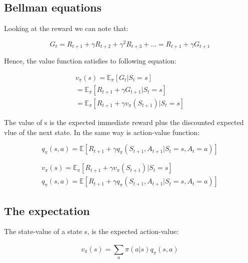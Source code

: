 \subsection{Bellman equations}
Looking at the reward we can note that:

	\begin{equation}
		G_t = R_{t+1} + \gamma R_{t+2} + \gamma^{2} R_{t+3} + ... = R_{t+1} + \gamma G_{t+1}
	\end{equation}

Hence, the value function satisfies to following equation:

	\begin{equation}
	\begin{aligned}
		v_\pi(s) = \mathbb{E}_\pi [G_t | S_t = s]\\
		= \mathbb{E}_\pi [R_{t+1} + \gamma G_{t+1} | S_t = s] \\
		= \mathbb{E}_\pi [R_{t+1} + \gamma v_\pi(S_{t+1}) | S_t =s ]
	\end{aligned}
	\end{equation}

The value of s is the expected immediate reward plus the discounted expected vlue of the next state. In the same way is action-value function: 

	\begin{equation}
		q_\pi (s,a) = \mathbb{E} [R_{t+1} + \gamma q_\pi(S_{t+1}, A_{t+1} | S_t = s, A_t = a)]
	\end{equation}
	

\begin{wbox}{}
	\begin{equation}
	\begin{aligned}
		v_\pi(s) = \mathbb{E}_\pi [R_{t+1} + \gamma v_\pi(S_{t+1}) | S_t =s ]\\
		q_\pi (s,a) = \mathbb{E} [R_{t+1} + \gamma q_\pi(S_{t+1}, A_{t+1} | S_t = s, A_t = a)] 
	\end{aligned}
	\end{equation}
\end{wbox}

\subsection{The expectation}
The state-value of a state s, is the expected action-value:

	\begin{equation}
		v_\pi(s)= \sum_{a}^{} \pi(a |s) q_\pi(s,a)
	\end{equation}

